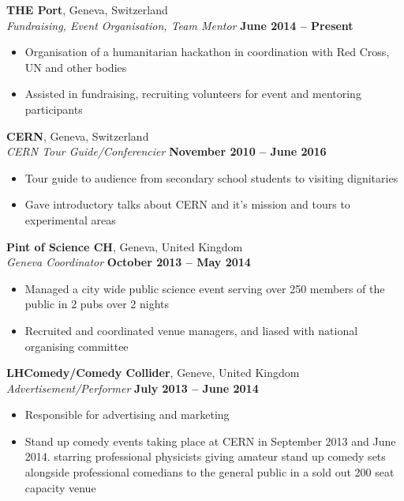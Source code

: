 \documentclass[margin,line]{resume}
\begin{document}
\begin{resume}
    \textbf{THE Port}, Geneva, Switzerland \\\vspace{1mm}%
    \textsl{Fundraising, Event Organisation, Team Mentor} \hfill \textbf{June 2014 -- Present}\\
    \begin{itemize}
    \item{Organisation of a humanitarian hackathon in coordination with Red Cross, UN and other bodies}
    \item{Assisted in fundraising, recruiting volunteers for event and mentoring participants}
    \end{itemize}

    \textbf{CERN}, Geneva, Switzerland \\\vspace{1mm}%
    \textsl{CERN Tour Guide/Conferencier} \hfill \textbf{November 2010 -- June 2016}\\
    \begin{itemize}
    \item{Tour guide to audience from secondary school students to visiting dignitaries}
    \item{Gave introductory talks about CERN and it's mission and tours to experimental areas}
    \end{itemize}

    \textbf{Pint of Science CH}, Geneva, United Kingdom\\\vspace{1mm}%
    \textsl{Geneva Coordinator} \hfill \textbf{October 2013 -- May 2014}\\
    \begin{itemize}
    \item{Managed a city wide public science event serving over 250 members of the public in 2 pubs over 2 nights}
    \item{Recruited and coordinated venue managers, and liased with national organising committee}
    \end{itemize}

    \textbf{LHComedy/Comedy Collider}, Geneve, United Kingdom\\\vspace{1mm}%
    \textsl{Advertisement/Performer} \hfill \textbf{July 2013 -- June 2014}\\
    \begin{itemize}
    \item{Responsible for advertising and marketing}
    \item{Stand up comedy events taking place at CERN in September 2013 and June 2014. starring professional physicists giving amateur stand up comedy sets alongside professional comedians to the general public in a sold out 200 seat capacity venue}
    \end{itemize}




\end{resume}
\end{document}
